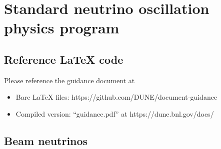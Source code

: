 \chapter{Standard neutrino oscillation physics program}
\label{ch:osc}

\section{Reference LaTeX code}

Please reference the guidance document at 

\begin{itemize}
\item Bare LaTeX files: https://github.com/DUNE/document-guidance
\item Compiled version: ``guidance.pdf'' at https://dune.bnl.gov/docs/
\end{itemize}


\section{Beam neutrinos}
\label{sec:osc-bm-nus}
